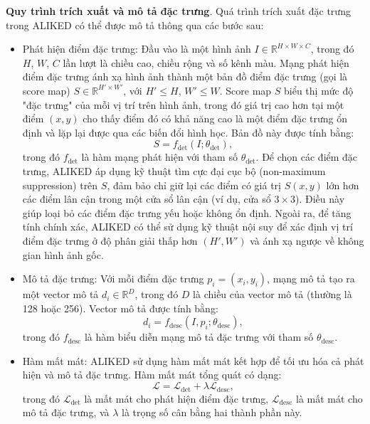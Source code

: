 \textbf{Quy trình trích xuất và mô tả đặc trưng}. Quá trình trích xuất đặc trưng trong ALIKED có thể được mô tả thông qua các bước sau:
\begin{itemize}
   \item Phát hiện điểm đặc trưng: Đầu vào là một hình ảnh \( I \in \mathbb{R}^{H \times W \times C} \), trong đó \( H \), \( W \), \( C \) lần lượt là chiều cao, chiều rộng và số kênh màu. Mạng phát hiện điểm đặc trưng ánh xạ hình ảnh thành một bản đồ điểm đặc trưng (gọi là score map) \( S \in \mathbb{R}^{H' \times W'} \), với \( H' \leq H \), \( W' \leq W \). Score map \( S \) biểu thị mức độ "đặc trưng" của mỗi vị trí trên hình ảnh, trong đó giá trị cao hơn tại một điểm \( (x, y) \) cho thấy điểm đó có khả năng cao là một điểm đặc trưng ổn định và lặp lại được qua các biến đổi hình học. Bản đồ này được tính bằng:
   \begin{equation}
       S = f_{\text{det}}(I; \theta_{\text{det}}),
   \end{equation}
   trong đó \( f_{\text{det}} \) là hàm mạng phát hiện với tham số \( \theta_{\text{det}} \). Để chọn các điểm đặc trưng, ALIKED áp dụng kỹ thuật tìm cực đại cục bộ (non-maximum suppression) trên \( S \), đảm bảo chỉ giữ lại các điểm có giá trị \( S(x, y) \) lớn hơn các điểm lân cận trong một cửa sổ lân cận (ví dụ, cửa sổ \( 3 \times 3 \)). Điều này giúp loại bỏ các điểm đặc trưng yếu hoặc không ổn định. Ngoài ra, để tăng tính chính xác, ALIKED có thể sử dụng kỹ thuật nội suy để xác định vị trí điểm đặc trưng ở độ phân giải thấp hơn \( (H', W') \) và ánh xạ ngược về không gian hình ảnh gốc.

   \item  Mô tả đặc trưng: Với mỗi điểm đặc trưng \( p_i = (x_i, y_i) \), mạng mô tả tạo ra một vector mô tả \( d_i \in \mathbb{R}^D \), trong đó \( D \) là chiều của vector mô tả (thường là 128 hoặc 256). Vector mô tả được tính bằng:
   \begin{equation}
       d_i = f_{\text{desc}}(I, p_i; \theta_{\text{desc}}),
   \end{equation}
   trong đó \( f_{\text{desc}} \) là hàm biểu diễn mạng mô tả đặc trưng với tham số \( \theta_{\text{desc}} \).
   \item Hàm mất mát:  ALIKED sử dụng hàm mất mát kết hợp để tối ưu hóa cả phát hiện và mô tả đặc trưng. Hàm mất mát tổng quát có dạng:
   \begin{equation}
       \mathcal{L} = \mathcal{L}_{\text{det}} + \lambda \mathcal{L}_{\text{desc}},
   \end{equation}
   trong đó \( \mathcal{L}_{\text{det}} \) là mất mát cho phát hiện điểm đặc trưng, \( \mathcal{L}_{\text{desc}} \) là mất mát cho mô tả đặc trưng, và \( \lambda \) là trọng số cân bằng hai thành phần này.


\end{itemize}
